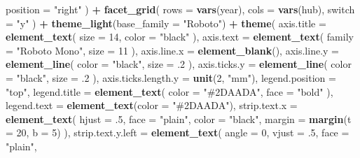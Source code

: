 \documentclass[
]{book}
\newenvironment{Shaded}{\begin{snugshade}}{\end{snugshade}}
\newcommand{\AttributeTok}[1]{\textcolor[rgb]{0.13,0.29,0.53}{#1}}
\newcommand{\DecValTok}[1]{\textcolor[rgb]{0.00,0.00,0.81}{#1}}
\newcommand{\FunctionTok}[1]{\textcolor[rgb]{0.13,0.29,0.53}{\textbf{#1}}}
\newcommand{\NormalTok}[1]{#1}
\newcommand{\SpecialCharTok}[1]{\textcolor[rgb]{0.81,0.36,0.00}{\textbf{#1}}}
\newcommand{\StringTok}[1]{\textcolor[rgb]{0.31,0.60,0.02}{#1}}
\begin{document}
\begin{Shaded}
\begin{Highlighting}[]
    \AttributeTok{position =} \StringTok{"right"}
\NormalTok{  ) }\SpecialCharTok{+}
  \FunctionTok{facet\_grid}\NormalTok{(}
    \AttributeTok{rows =} \FunctionTok{vars}\NormalTok{(year),}
    \AttributeTok{cols =} \FunctionTok{vars}\NormalTok{(hub),}
    \AttributeTok{switch =} \StringTok{"y"}
\NormalTok{  ) }\SpecialCharTok{+}
  \FunctionTok{theme\_light}\NormalTok{(}\AttributeTok{base\_family =} \StringTok{"Roboto"}\NormalTok{) }\SpecialCharTok{+}
  \FunctionTok{theme}\NormalTok{(}
    \AttributeTok{axis.title =} \FunctionTok{element\_text}\NormalTok{(}
      \AttributeTok{size =} \DecValTok{14}\NormalTok{,}
      \AttributeTok{color =} \StringTok{"black"}
\NormalTok{    ),}
    \AttributeTok{axis.text =} \FunctionTok{element\_text}\NormalTok{(}
      \AttributeTok{family =} \StringTok{"Roboto Mono"}\NormalTok{,}
      \AttributeTok{size =} \DecValTok{11}
\NormalTok{    ),}
    \AttributeTok{axis.line.x =} \FunctionTok{element\_blank}\NormalTok{(),}
    \AttributeTok{axis.line.y =} \FunctionTok{element\_line}\NormalTok{(}
      \AttributeTok{color =} \StringTok{"black"}\NormalTok{,}
      \AttributeTok{size =}\NormalTok{ .}\DecValTok{2}
\NormalTok{    ),}
    \AttributeTok{axis.ticks.y =} \FunctionTok{element\_line}\NormalTok{(}
      \AttributeTok{color =} \StringTok{"black"}\NormalTok{,}
      \AttributeTok{size =}\NormalTok{ .}\DecValTok{2}
\NormalTok{    ),}
    \AttributeTok{axis.ticks.length.y =} \FunctionTok{unit}\NormalTok{(}\DecValTok{2}\NormalTok{, }\StringTok{"mm"}\NormalTok{),}
    \AttributeTok{legend.position =} \StringTok{"top"}\NormalTok{,}
    \AttributeTok{legend.title =} \FunctionTok{element\_text}\NormalTok{(}
      \AttributeTok{color =} \StringTok{"\#2DAADA"}\NormalTok{,}
      \AttributeTok{face =} \StringTok{"bold"}
\NormalTok{    ),}
    \AttributeTok{legend.text =} \FunctionTok{element\_text}\NormalTok{(}\AttributeTok{color =} \StringTok{"\#2DAADA"}\NormalTok{),}
    \AttributeTok{strip.text.x =} \FunctionTok{element\_text}\NormalTok{(}
      \AttributeTok{hjust =}\NormalTok{ .}\DecValTok{5}\NormalTok{,}
      \AttributeTok{face =} \StringTok{"plain"}\NormalTok{,}
      \AttributeTok{color =} \StringTok{"black"}\NormalTok{,}
      \AttributeTok{margin =} \FunctionTok{margin}\NormalTok{(}\AttributeTok{t =} \DecValTok{20}\NormalTok{, }\AttributeTok{b =} \DecValTok{5}\NormalTok{)}
\NormalTok{    ),}
    \AttributeTok{strip.text.y.left =} \FunctionTok{element\_text}\NormalTok{(}
      \AttributeTok{angle =} \DecValTok{0}\NormalTok{,}
      \AttributeTok{vjust =}\NormalTok{ .}\DecValTok{5}\NormalTok{,}
      \AttributeTok{face =} \StringTok{"plain"}\NormalTok{,}

\end{Highlighting}
\end{Shaded}
\end{document}
